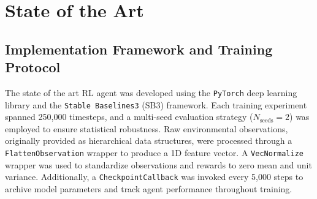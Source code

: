 \section{State of the Art}

\subsection{Implementation Framework and Training Protocol}
The state of the art RL agent was developed using the \texttt{PyTorch} deep learning library and the \texttt{Stable Baselines3} (SB3) framework. Each training experiment spanned 250,000 timesteps, and a multi-seed evaluation strategy ($N_{\text{seeds}}=2$) was employed to ensure statistical robustness. Raw environmental observations, originally provided as hierarchical data structures, were processed through a \texttt{FlattenObservation} wrapper to produce a 1D feature vector. A \texttt{VecNormalize} wrapper was used to standardize observations and rewards to zero mean and unit variance. Additionally, a \texttt{CheckpointCallback} was invoked every 5,000 steps to archive model parameters and track agent performance throughout training.


